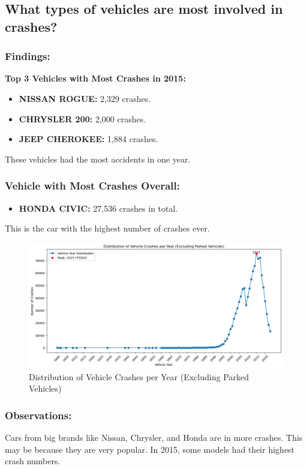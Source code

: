 \documentclass[a4paper,10pt]{article}
\begin{document}
\subsection{What types of vehicles are most involved in crashes?}

\subsubsection{Findings:}
\textbf{Top 3 Vehicles with Most Crashes in 2015:}
\begin{itemize}
    \item \textbf{NISSAN ROGUE:} 2,329 crashes.
    \item \textbf{CHRYSLER 200:} 2,000 crashes.
    \item \textbf{JEEP CHEROKEE:} 1,884 crashes.
\end{itemize}
These vehicles had the most accidents in one year.

\subsubsection{Vehicle with Most Crashes Overall:}
\begin{itemize}
    \item \textbf{HONDA CIVIC:} 27,536 crashes in total.
\end{itemize}
This is the car with the highest number of crashes ever.


\begin{figure}
    \centering
    \includegraphics[width=0.75\linewidth]{images/vehicle-crashes-per-year.png}
    \caption{Distribution of Vehicle Crashes per Year (Excluding Parked Vehicles)}
    \label{fig:3.4}
\end{figure}

\subsubsection{Observations:}
Cars from big brands like Nissan, Chrysler, and Honda are in more crashes. This may be because they are very popular. In 2015, some models had their highest crash numbers.
\end{document}
